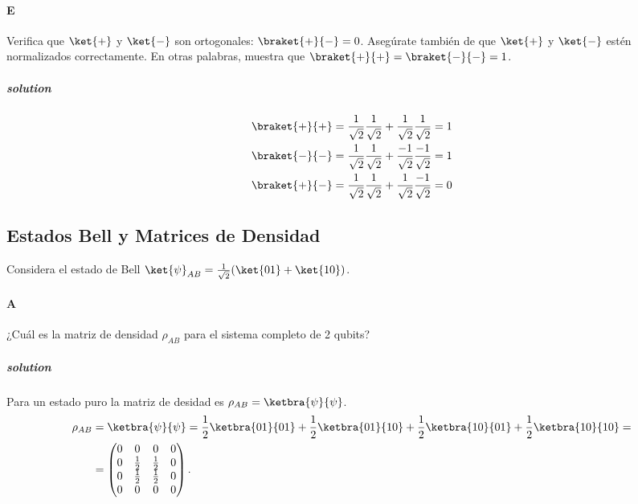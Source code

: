 \paragraph{E} Verifica que $\ket{+}$ y $\ket{-}$ son ortogonales: $\braket{+}{-}= 0$.
Asegúrate también de que $\ket{+}$ y $\ket{-}$ estén normalizados correctamente.
En otras palabras, muestra que $\braket{+}{+}=\braket{-}{-}=1$.
\subparagraph{solution}
	\begin{equation*}
		\begin{split}
			\braket{+}{+} &= \frac{1}{\sqrt{2}}\frac{1}{\sqrt{2}}+\frac{1}{\sqrt{2}}\frac{1}{\sqrt{2}}=1\\
			\braket{-}{-} &= \frac{1}{\sqrt{2}}\frac{1}{\sqrt{2}}+\frac{-1}{\sqrt{2}}\frac{-1}{\sqrt{2}}=1\\
			\braket{+}{-} &= \frac{1}{\sqrt{2}}\frac{1}{\sqrt{2}}+\frac{1}{\sqrt{2}}\frac{-1}{\sqrt{2}}=0\\
		\end{split}
	\end{equation*}


\subsection{Estados Bell y Matrices de Densidad}
Considera el estado de Bell $\ket{\psi}_{AB}=\frac{1}{\sqrt{2}}(\ket{01}+\ket{10})$.

\paragraph{A} ¿Cuál es la matriz de densidad $\rho_{AB}$ para el sistema completo de 2 qubits?
\subparagraph{solution}
	Para un estado puro la matriz de desidad es $\rho_{AB}=\ketbra{\psi}{\psi}$.
	\begin{equation*}
		\begin{split}
		\rho_{AB}&=\ketbra{\psi}{\psi}=\frac{1}{2}\ketbra{01}{01}+\frac{1}{2}\ketbra{01}{10}+\frac{1}{2}\ketbra{10}{01}+\frac{1}{2}\ketbra{10}{10}=\\
		&=\begin{pmatrix}
		0 & 0 & 0 & 0 \\ 0 & \frac{1}{2} & \frac{1}{2} & 0 \\ 0 & \frac{1}{2} & \frac{1}{2} & 0 \\ 0 & 0 & 0 & 0 \end{pmatrix}.
		\end{split}
	\end{equation*}


